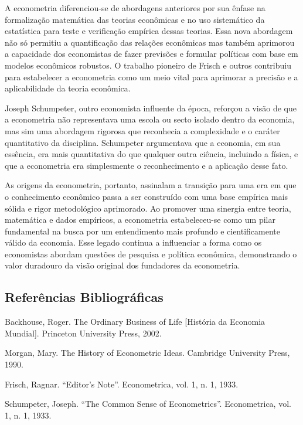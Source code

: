 \documentclass[a4paper,12pt]{article}[abntex2]
\begin{document}
A econometria diferenciou-se de abordagens anteriores por sua ênfase na formalização matemática das teorias econômicas e no uso sistemático da estatística para teste e verificação empírica dessas teorias. Essa nova abordagem não só permitiu a quantificação das relações econômicas mas também aprimorou a capacidade dos economistas de fazer previsões e formular políticas com base em modelos econômicos robustos. O trabalho pioneiro de Frisch e outros contribuiu para estabelecer a econometria como um meio vital para aprimorar a precisão e a aplicabilidade da teoria econômica.

Joseph Schumpeter, outro economista influente da época, reforçou a visão de que a econometria não representava uma escola ou secto isolado dentro da economia, mas sim uma abordagem rigorosa que reconhecia a complexidade e o caráter quantitativo da disciplina. Schumpeter argumentava que a economia, em sua essência, era mais quantitativa do que qualquer outra ciência, incluindo a física, e que a econometria era simplesmente o reconhecimento e a aplicação desse fato.

As origens da econometria, portanto, assinalam a transição para uma era em que o conhecimento econômico passa a ser construído com uma base empírica mais sólida e rigor metodológico aprimorado. Ao promover uma sinergia entre teoria, matemática e dados empíricos, a econometria estabeleceu-se como um pilar fundamental na busca por um entendimento mais profundo e cientificamente válido da economia. Esse legado continua a influenciar a forma como os economistas abordam questões de pesquisa e política econômica, demonstrando o valor duradouro da visão original dos fundadores da econometria.


\subsection{\textbf{Referências Bibliográficas}}
Backhouse, Roger. The Ordinary Business of Life [História da Economia Mundial]. Princeton
University Press, 2002.

Morgan, Mary. The History of Econometric Ideas. Cambridge University Press, 1990.

Frisch, Ragnar. “Editor’s Note”. Econometrica, vol. 1, n. 1, 1933.

Schumpeter, Joseph. “The Common Sense of Econometrics”. Econometrica, vol. 1, n. 1,
1933.
\end{document}
